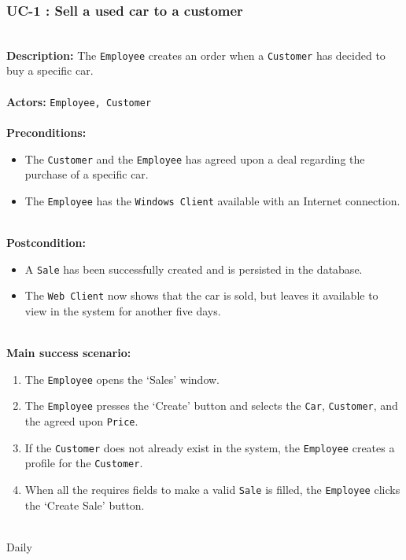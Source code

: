 \subsubsection{UC-1 : Sell a used car to a customer}
\label{create_order_use_case}
\HRule \\[0.4cm]
\textbf{Description:} The \texttt{Employee} creates an order when a \texttt{Customer} has decided to buy a specific car. \\
\HRule \\[0.4cm]
\textbf{Actors:} \texttt{Employee, Customer}\\
\HRule \\[0.4cm]
\textbf{Preconditions:} 
\begin{itemize}
    \item The \texttt{Customer} and the \texttt{Employee} has agreed upon a deal regarding the purchase of a specific car.
    \item The \texttt{Employee} has the \texttt{Windows Client} available with an Internet connection.
\end{itemize}
\HRule \\[0.4cm]
\textbf{Postcondition:}
\begin{itemize}
    \item A \texttt{Sale} has been successfully created and is persisted in the database.
    \item The \texttt{Web Client} now shows that the car is sold, but leaves it available to view in the system for another five days.
\end{itemize}
\HRule \\[0.4cm]
\textbf{Main success scenario:}
\begin{enumerate}
    \item The \texttt{Employee} opens the `Sales' window.
    \item The \texttt{Employee} presses the `Create' button and selects the \texttt{Car}, \texttt{Customer}, and the agreed upon \texttt{Price}.
    \item If the \texttt{Customer} does not already exist in the system, the \texttt{Employee} creates a profile for the  \texttt{Customer}.
    \item When all the requires fields to make a valid \texttt{Sale} is filled, the \texttt{Employee} clicks the `Create Sale' button.
\end{enumerate}
\HRule \\[0.4cm]
Daily \\
\HRule \\[0.4cm]

